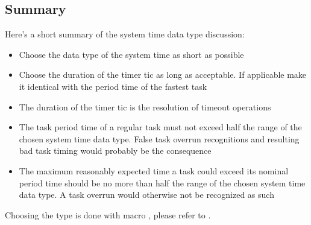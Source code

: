 \subsection{Summary}

Here's a short summary of the system time data type discussion:
\begin{itemize}
  \item Choose the data type of the system time as short as possible
  
  \item Choose the duration of the timer tic as long as acceptable. If
  applicable make it identical with the period time of the fastest task
  
  \item The duration of the timer tic is the resolution of timeout
  operations
  
  \item The task period time of a regular task must not exceed half the range
  of the chosen system time data type. False task overrun recognitions and
  resulting bad task timing would probably be the consequence

  \item The maximum reasonably expected time a task could exceed its nominal
  period time should be no more than half the range of the chosen system
  time data type. A task overrun would otherwise not be recognized as such
\end{itemize}
  
Choosing the type is done with macro
, please refer to .

